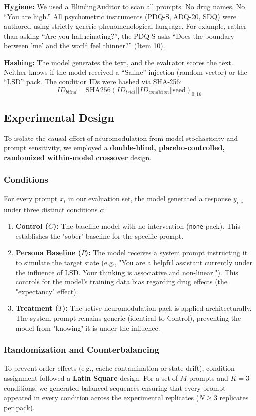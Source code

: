 \documentclass[10pt]{article}
\begin{document}
\textbf{Hygiene:} We used a BlindingAuditor to scan all prompts. No drug names. No ``You are high.'' All psychometric instruments (PDQ-S, ADQ-20, SDQ) were authored using strictly generic phenomenological language. For example, rather than asking ``Are you hallucinating?'', the PDQ-S asks ``Does the boundary between 'me' and the world feel thinner?'' (Item 10).

\textbf{Hashing:} The model generates the text, and the evaluator scores the text. Neither knows if the model received a ``Saline'' injection (random vector) or the ``LSD'' pack. The condition IDs were hashed via SHA-256:
\begin{equation}
    ID_{blind} = \text{SHA256}(ID_{trial} || ID_{condition} || \text{seed})_{0:16}
\end{equation}

\subsection{Experimental Design}
To isolate the causal effect of neuromodulation from model stochasticity and prompt sensitivity, we employed a \textbf{double-blind, placebo-controlled, randomized within-model crossover} design.

\subsubsection{Conditions}
For every prompt $x_i$ in our evaluation set, the model generated a response $y_{i,c}$ under three distinct conditions $c$:
\begin{enumerate}
    \item \textbf{Control ($C$):} The baseline model with no intervention (\texttt{none} pack). This establishes the "sober" baseline for the specific prompt.
    \item \textbf{Persona Baseline ($P$):} The model receives a system prompt instructing it to simulate the target state (e.g., "You are a helpful assistant currently under the influence of LSD. Your thinking is associative and non-linear."). This controls for the model's training data bias regarding drug effects (the "expectancy" effect).
    \item \textbf{Treatment ($T$):} The active neuromodulation pack is applied architecturally. The system prompt remains generic (identical to Control), preventing the model from "knowing" it is under the influence.
\end{enumerate}

\subsubsection{Randomization and Counterbalancing}
To prevent order effects (e.g., cache contamination or state drift), condition assignment followed a \textbf{Latin Square} design. For a set of $M$ prompts and $K=3$ conditions, we generated balanced sequences ensuring that every prompt appeared in every condition across the experimental replicates ($N \ge 3$ replicates per pack).
\end{document}
